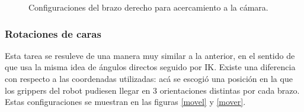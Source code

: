 \begin{figure}[h!]
	\centering
	\hfill
	\hfill
	\caption{Configuraciones del brazo derecho para acercamiento a la cámara.}
	\label{camr}
\end{figure}

\subsubsection{Rotaciones de caras}
Esta tarea se resuleve de una manera muy similar a la anterior, en el sentido de que usa la misma idea de ángulos directos seguido por IK. Existe una diferencia con respecto a las coordenadas utilizadas: acá se escogió una posición en la que los grippers del robot pudiesen llegar en 3 orientaciones distintas por cada brazo. Estas configuraciones se muestran en las figuras \ref{movel} y \ref{mover}.

